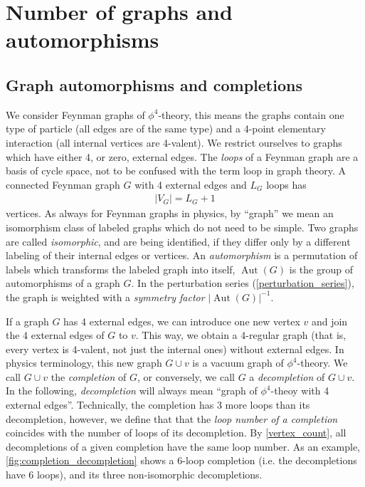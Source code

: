 \documentclass[12pt,a4paper]{article}
\newcommand{\abs}[1]{\lvert #1 \rvert}
\newcommand{\Aut}{\operatorname{Aut}}
\renewcommand{\|}{\rule[-0.4ex]{0.2ex}{1.2em}}
\begin{document}
\newpage



	
\section{Number of graphs and automorphisms}\label{sec:number_of_graphs}


\subsection{Graph automorphisms and completions}\label{sec:automorphism}





We consider Feynman graphs of $\phi^4$-theory, this means the graphs contain one type of particle (all edges are of the same type) and a 4-point elementary interaction (all internal vertices are 4-valent). We restrict ourselves to graphs which have either 4, or zero, external edges. The \emph{loops} of a Feynman graph are a basis of cycle space, not to be confused with the term loop in graph theory. A connected Feynman graph $G$ with 4 external edges and $L_G$ loops has 
\begin{align}\label{vertex_count}
	\abs{V_G}=L_G+1
\end{align}
vertices. 
As always for Feynman graphs in physics, by \enquote{graph} we mean an  isomorphism class of labeled graphs which do not need to be simple. Two graphs are called \emph{isomorphic}, and are being identified, if they differ only by a different labeling of their internal edges or vertices. An \emph{automorphism} is a permutation of labels which transforms the labeled graph into itself,  $\Aut(G)$ is the group of automorphisms of a graph $G$. In the perturbation series (\cref{perturbation_series}), the graph is weighted  with a \emph{symmetry factor} $\abs{\Aut(G)}^{-1}$. 




If a graph $G$  has 4 external edges, we can introduce one new vertex $v$ and join the 4 external edges of $G$ to $v$. This way, we obtain a 4-regular graph (that is, every vertex is 4-valent, not just the internal ones) without external edges. In physics terminology, this new graph $G\cup v$ is a vacuum graph of $\phi^4$-theory. We call $G\cup v$ the \emph{completion} of $G$, or conversely, we call $G$   a \emph{decompletion} of $G\cup v$. In the following, \emph{decompletion} will always mean \enquote{graph of $\phi^4$-theoy with 4 external edges}. Technically, the completion has 3 more loops than its decompletion, however, we define that that the \emph{loop number of a completion} coincides with the number of loops of its decompletion.   By \cref{vertex_count}, all decompletions of a given completion have the same loop number. 
As an example, \cref{fig:completion_decompletion} shows a 6-loop completion (i.e. the decompletions have 6 loops), and its three non-isomorphic decompletions. 
\end{document}
